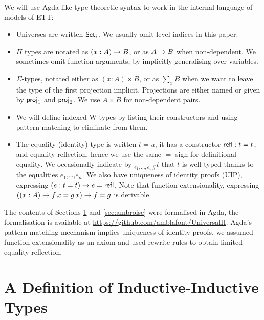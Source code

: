\documentclass[a4paper,UKenglish,cleveref, autoref]{lipics-v2019}
\begin{document}
We will use Agda-like type theoretic syntax to work in the internal
language of models of ETT:
\begin{itemize}
\item Universes are written $\mathsf{Set}_i$. We usually omit level indices in this paper.
\item $\Pi$ types are notated as $(x : A)\rightarrow B$, or as $A \rightarrow B$ when
  non-dependent. We sometimes omit function arguments, by implicitly
  generalising over variables.
\item $\Sigma$-types, notated either as $(x : A)\times B$, or as
  $\sum\limits_{x} B$ when we want to leave the type of the first
  projection implicit. Projections are either named or given by
  $\mathsf{proj}_1$ and $\mathsf{proj}_2$. We use $A \times B$ for non-dependent
  pairs.
\item We will define indexed W-types \cite{indexedcont} by listing
  their constructors and using pattern matching to eliminate from
  them.
\item The equality (identity) type is written $t = u$, it has a
  constructor $\mathsf{refl} : t = t$, and equality reflection, hence we use
  the same $=$ sign for definitional equality. We occasionally
  indicate by $_{e_1,\dots,e_n \#}t$ that $t$ is well-typed thanks to the
  equalities $e_1$,\dots,$e_n$. We also have uniqueness of identity
  proofs (UIP), expressing $(e : t = t)\rightarrow e = \mathsf{refl}$. Note that
  function extensionality, expressing
  $((x : A) \rightarrow f\,x = g\,x) \rightarrow f = g$ is derivable.
\end{itemize}

The contents of Sections \ref{sec:theory_of_signatures} and
\ref{sec:ambroise} were formalised in Agda, the formalisation is
available at \url{https://github.com/amblafont/UniversalII}. Agda's
pattern matching mechanism implies uniqueness of identity proofs, we
assumed function extensionality as an axiom and used rewrite rules
\cite{cockxsprinkles} to obtain limited equality reflection.


\section{A Definition of Inductive-Inductive Types}
\label{sec:theory_of_signatures}
\end{document}
